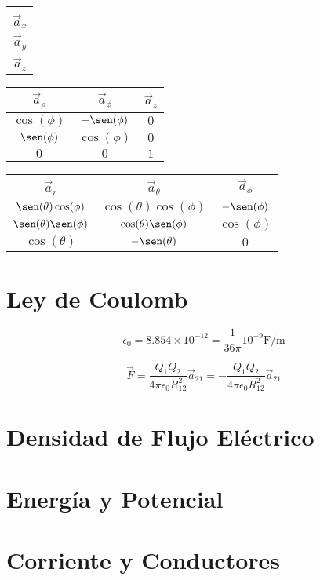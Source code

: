 \documentclass[fontsize=8pt]{scrartcl}
\begin{document}
\begin{multicols}{3}
      \begin{table}[H]
        \begin{tabular}{|c|}
          \hline \\
          $\vec{a}_x$\\
          $\vec{a}_y$\\
          $\vec{a}_z$\\\hline
        \end{tabular}
        \begin{tabular}{| c c c |}
          \hline
          $\vec{a}_\rho$ & $\vec{a}_\phi$  & $\vec{a}_z$ \\ \hline
          $\cos(\phi)$   & $-\sen(\phi)$   & $0$         \\
          $\sen(\phi)$   & $\cos(\phi)$    & $0$         \\
          $0$            & $0$             & $1$         \\ \hline
        \end{tabular}
        \begin{tabular}{| c c c |}
          \hline
          $\vec{a}_r$ & $\vec{a}_\theta$  & $\vec{a}_\phi$ \\ \hline
          $\sen(\theta)\cos(\phi)$ & $\cos(\theta)\cos(\phi)$ & $-\sen(\phi)$         \\
          $\sen(\theta)\sen(\phi)$ & $\cos(\theta)\sen(\phi)$  & $\cos(\phi)$         \\
          $\cos(\theta)$           & $-\sen(\theta)$             & $0$         \\ \hline
        \end{tabular}
      \end{table}

    \section*{Ley de Coulomb}

    \begin{equation*}
      \tag{permitividad del espacio}
      \epsilon_0 = 8.854 \times 10^{-12} = \frac{1}{36\pi} 10^{-9} \text{F}/\text{m}
    \end{equation*}

    \begin{equation*}
      \tag{fuerza eléctrica}
      \vec{F} = \frac{Q_1 Q_2}{4\pi\epsilon_0R_{12}^2} \vec{a}_{21} = -\frac{Q_1 Q_2}{4\pi\epsilon_0R_{12}^2} \vec{a}_{21}
    \end{equation*}

    \section*{Densidad de Flujo Eléctrico}

    \section*{Energía y Potencial}

    \section*{Corriente y Conductores}
  \end{multicols}
\end{document}
